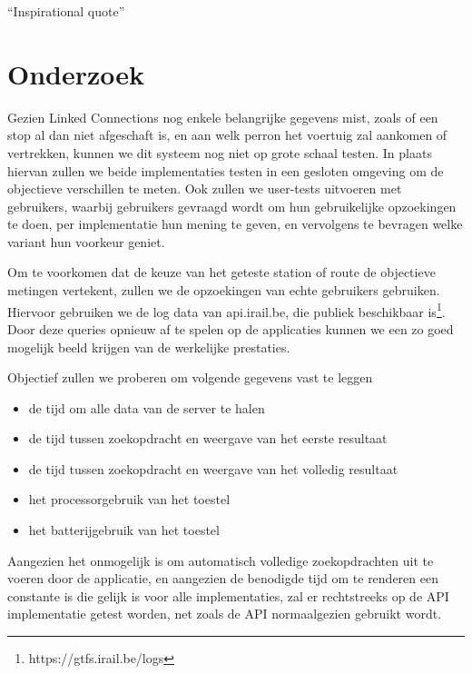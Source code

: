 \begin{savequote}[0.55\linewidth]
	``Inspirational quote''
\end{savequote}

\chapter{Onderzoek}
Gezien Linked Connections nog enkele belangrijke gegevens mist, zoals of een stop al dan niet afgeschaft is, en aan welk perron het voertuig zal aankomen of vertrekken, kunnen we dit systeem nog niet op grote schaal testen. In plaats hiervan zullen we beide implementaties testen in een gesloten omgeving om de objectieve verschillen te meten. Ook zullen we user-tests uitvoeren met gebruikers, waarbij gebruikers gevraagd wordt om hun gebruikelijke opzoekingen te doen, per implementatie hun mening te geven, en vervolgens te bevragen welke variant hun voorkeur geniet.

Om te voorkomen dat de keuze van het geteste station of route de objectieve metingen vertekent, zullen we de opzoekingen van echte gebruikers gebruiken. Hiervoor gebruiken we de log data van api.irail.be, die publiek beschikbaar is\footnote{https://gtfs.irail.be/logs}. Door deze queries opnieuw af te spelen op de applicaties kunnen we een zo goed mogelijk beeld krijgen van de werkelijke prestaties.

Objectief zullen we proberen om volgende gegevens vast te leggen
\begin{itemize}
	\item de tijd om alle data van de server te halen
	\item de tijd tussen zoekopdracht en weergave van het eerste resultaat
	\item de tijd tussen zoekopdracht en weergave van het volledig resultaat
	\item het processorgebruik van het toestel
	\item het batterijgebruik van het toestel
\end{itemize}
Aangezien het onmogelijk is om automatisch volledige zoekopdrachten uit te voeren door de applicatie, en aangezien de benodigde tijd om te renderen een constante is die gelijk is voor alle implementaties, zal er rechtstreeks op de API implementatie getest worden, net zoals de API normaalgezien gebruikt wordt.